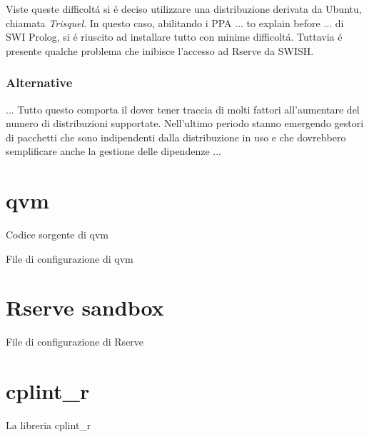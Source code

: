 \documentclass[10pt,titlepage,twoside,a4paper]{report}
\newenvironment{code}{\singlespacing\captionsetup{type=listing}}{}
\begin{document}
Viste queste difficolt\'a si \'e deciso utilizzare una distribuzione derivata 
da Ubuntu, chiamata \emph{Trisquel}. In questo caso, abilitando i PPA ... to 
explain before ... di SWI Prolog, si \'e riuscito ad installare tutto con 
minime difficolt\'a. Tuttavia \'e presente qualche problema che inibisce 
l'accesso ad Rserve da SWISH.

\subsection{Alternative}
... Tutto questo comporta il dover tener traccia di molti fattori
all'aumentare del numero di distribuzioni supportate. Nell'ultimo periodo 
stanno emergendo gestori di pacchetti che sono indipendenti dalla distribuzione 
in uso e che dovrebbero semplificare anche la gestione delle dipendenze ...




\appendix
\chapter{qvm} \label{app:qvm}

    \begin{code}
        \caption{Codice sorgente di qvm}
    \end{code}

    \newpage

    \begin{code}
        \caption{File di configurazione di qvm}
    \end{code}




\chapter{Rserve sandbox} \label{app:rserve-sandbox}
    \begin{code}
        \caption{File di configurazione di Rserve}
    \end{code}

\chapter{cplint\_r} \label{app:cplint-r}
    \begin{code}
        \caption{La libreria cplint\_r}
    \end{code}






\end{document}

